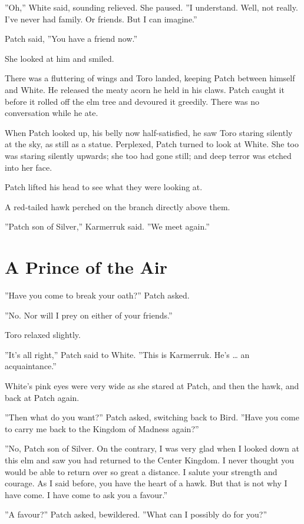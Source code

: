 \documentclass[12pt]{book}
\begin{document}
''Oh,'' White said, sounding relieved. She paused. ''I understand. Well, not really. I've never had family. Or friends. But I can imagine.''

Patch said, ''You have a friend now.''

She looked at him and smiled.

There was a fluttering of wings and Toro landed, keeping Patch between himself and White. He released the meaty acorn he held in his claws. Patch caught it before it rolled off the elm tree and devoured it greedily. There was no conversation while he ate.

When Patch looked up, his belly now half-satisfied, he saw Toro staring silently at the sky, as still as a statue. Perplexed, Patch turned to look at White. She too was staring silently upwards; she too had gone still; and deep terror was etched into her face.

Patch lifted his head to see what they were looking at.

A red-tailed hawk perched on the branch directly above them.

''Patch son of Silver,'' Karmerruk said. ''We meet again.''


\section{A Prince of the Air}

''Have you come to break your oath?'' Patch asked.

''No. Nor will I prey on either of your friends.''

Toro relaxed slightly.

''It's all right,'' Patch said to White. ''This is Karmerruk. He's \ldots{}
an acquaintance.''

White's pink eyes were very wide as she stared at Patch, and then the hawk, and back at Patch again.

''Then what do you want?'' Patch asked, switching back to Bird. ''Have you come to carry me back to the Kingdom of Madness again?''

''No, Patch son of Silver. On the contrary, I was very glad when I looked down at this elm and saw you had returned to the Center Kingdom. I never thought you would be able to return over so great a distance. I salute your strength and courage. As I said before, you have the heart of a hawk. But that is not why I have come. I have come to ask you a favour.''

''A favour?'' Patch asked, bewildered. ''What can I possibly do for you?''
\end{document}
